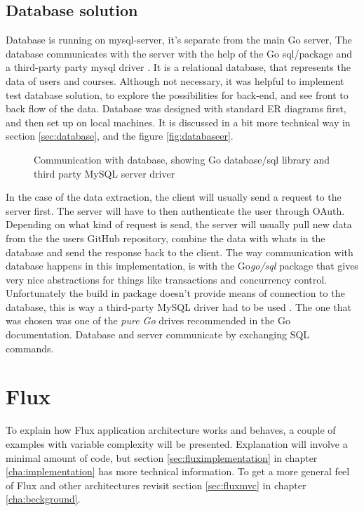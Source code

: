 \subsection{Database solution}
Database is running on mysql-server, it's separate from the main Go server, The database communicates with the server with the help of the Go sql/package and a third-party party mysql driver \cite{ziutek}. It is a relational database, that represents the data of users and courses. Although not necessary, it was helpful to implement test database solution, to explore the possibilities for back-end, and see front to back flow of the data. Database was designed with standard ER diagrams first, and then set up on local machines.
It is discussed in a bit more technical way in section \ref{sec:database}, and the figure \ref{fig:databaseer}.
\begin{figure}[h]
  \scalebox{1}{}
  \caption{Communication with database, showing Go database/sql library and third party MySQL server driver \cite{ziutekdriver}}
  \label{fig:databaseoverview}
\end{figure}

In the case of the data extraction, the client will usually send a request to the server first. The server will have to then authenticate the user through OAuth. Depending on what kind of request is send, the server will usually pull new data from the the users GitHub repository, combine the data with whats in the database and send the response back to the client. The way communication with database happens in this implementation, is with the Go\emph{go/sql} package that gives very nice abstractions for things like transactions and concurrency control. Unfortunately the build in package doesn't provide means of connection to the database, this is way a third-party MySQL driver had to be used \cite{ziutek}. The one that was chosen was one of the \emph{pure Go} drives recommended in the Go documentation. Database and server communicate by exchanging SQL commands.
\section{Flux}
To explain how Flux application architecture works and behaves, a couple of examples with variable complexity will be presented. Explanation will involve a minimal amount of code, but section \ref{sec:fluximplementation} in chapter \ref{cha:implementation} has more technical information. To get a more general feel of Flux and other architectures revisit section \ref{sec:fluxmvc} in chapter \ref{cha:beckground}.

